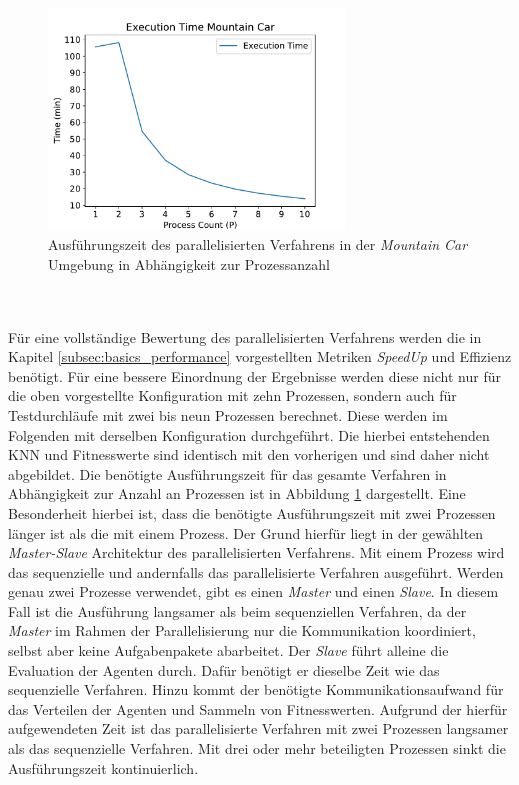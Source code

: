 \begin{figure}[!h]
	\centering
	\includegraphics[width=0.7\textwidth]{./img/mountain_car_analysis/time_mountain_car_1_10.pdf} 
	\caption{Ausführungszeit des parallelisierten Verfahrens in der \emph{Mountain Car} Umgebung in Abhängigkeit zur Prozessanzahl}
	\label{fig:execution_time_mountain_car_1_10}
\end{figure}
\\\\
Für eine vollständige Bewertung des parallelisierten Verfahrens werden die in Kapitel \ref{subsec:basics_performance} vorgestellten Metriken \emph{SpeedUp} und Effizienz benötigt. Für eine bessere Einordnung der Ergebnisse werden diese nicht nur für die oben vorgestellte Konfiguration mit zehn Prozessen, sondern auch für Testdurchläufe mit zwei bis neun Prozessen berechnet. Diese werden im Folgenden mit derselben Konfiguration durchgeführt. Die hierbei entstehenden \ac{KNN} und Fitnesswerte sind identisch mit den vorherigen und sind daher nicht abgebildet. Die benötigte Ausführungszeit für das gesamte Verfahren in Abhängigkeit zur Anzahl an Prozessen ist in Abbildung \ref{fig:execution_time_mountain_car_1_10} dargestellt. Eine Besonderheit hierbei ist, dass die benötigte Ausführungszeit mit zwei Prozessen länger ist als die mit einem Prozess. Der Grund hierfür liegt in der gewählten \emph{Master-Slave} Architektur des parallelisierten Verfahrens. Mit einem Prozess wird das sequenzielle und andernfalls das parallelisierte Verfahren ausgeführt. Werden genau zwei Prozesse verwendet, gibt es einen \emph{Master} und einen \emph{Slave}. In diesem Fall ist die Ausführung langsamer als beim sequenziellen Verfahren, da der \emph{Master} im Rahmen der Parallelisierung nur die Kommunikation koordiniert, selbst aber keine Aufgabenpakete abarbeitet. Der \emph{Slave} führt alleine die Evaluation der Agenten durch. Dafür benötigt er dieselbe Zeit wie das sequenzielle Verfahren. Hinzu kommt der benötigte Kommunikationsaufwand für das Verteilen der Agenten und Sammeln von Fitnesswerten. Aufgrund der hierfür aufgewendeten Zeit ist das parallelisierte Verfahren mit zwei Prozessen langsamer als das sequenzielle Verfahren. Mit drei oder mehr beteiligten Prozessen sinkt die Ausführungszeit kontinuierlich. 
